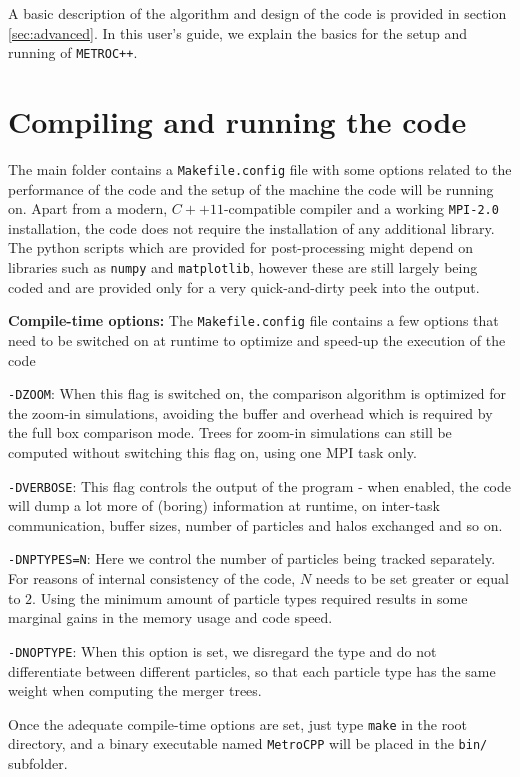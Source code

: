 \documentclass{article}
\begin{document}
A basic description of the algorithm and design of the code is provided in section \ref{sec:advanced}.
In this user's guide, we explain the basics for the setup and running of \texttt{METROC++}.


\section{Compiling and running the code}

The main folder contains a \texttt{Makefile.config} file with some options related to the performance of the code and the 
setup of the machine the code will be running on. Apart from a modern, $C++11$-compatible compiler and a working 
\texttt{MPI-2.0} installation, the code does not require the installation of any additional library.
The python scripts which are provided for post-processing might depend on libraries such as \texttt{numpy} and \texttt{matplotlib},
however these are still largely being coded and are provided only for a very quick-and-dirty peek into the output.

\noindent
\textbf{Compile-time options:} The \texttt{Makefile.config} file contains a few options that need to be switched on at runtime 
to optimize and speed-up the execution of the code

\noindent
\texttt{-DZOOM}: When this flag is switched on, the comparison algorithm is optimized for the 
zoom-in simulations, avoiding the buffer and overhead which is required by the full box comparison mode. 
Trees for zoom-in simulations can still be computed without switching this flag on, using one MPI task only.

\noindent
\texttt{-DVERBOSE}: This flag controls the output of the program - when enabled, the code will dump a lot more of 
(boring) information at runtime, on inter-task communication, buffer sizes, number of particles and halos exchanged and so on.

\noindent
\texttt{-DNPTYPES=N}: Here we control the number of particles being tracked separately. For reasons of internal consistency 
of the code, $N$ needs to be set greater or equal to $2$. Using the minimum amount of particle types required results in some marginal
gains in the memory usage and code speed.

\noindent
\texttt{-DNOPTYPE}: When this option is set, we disregard the type and do not differentiate between different particles, so that
each particle type has the same weight when computing the merger trees.

Once the adequate compile-time options are set, just type \texttt{make} in the root directory, and a binary executable named 
\texttt{MetroCPP} will be placed in the \texttt{bin/} subfolder. 
\end{document}
